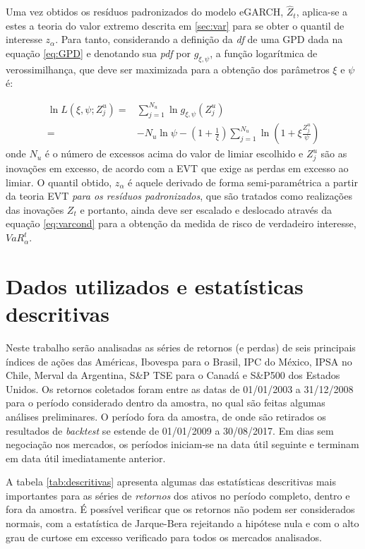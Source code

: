 \documentclass[1p]{elsarticle}
\theoremstyle{definition}
\begin{document}
Uma vez obtidos os resíduos padronizados do modelo eGARCH, $\hat{Z}_t$, aplica-se a estes a teoria do valor extremo descrita em \ref{sec:var} para se obter o quantil de interesse $z_\alpha$. Para tanto, considerando a definição da \emph{df} de uma GPD dada na equação \eqref{eq:GPD} e denotando sua \emph{pdf} por $g_{\xi, \psi}$, a função logarítmica de verossimilhança, que deve ser maximizada para a obtenção dos parâmetros $\xi$ e $\psi$ é:

\begin{align}
\label{eq:gpdloglik}
\ln L(\xi, \psi; Z^u_j)=&\sum\limits_{j=1}^{N_u}\ln g_{\xi, \psi}(Z^u_j)\nonumber\\
					   =&-N_u \ln \psi-\left(1+\frac{1}{\xi}\right)\sum\limits_{j=1}^{N_u}\ln \left(1+\xi\frac{Z^u_j}{\psi}\right) 
\end{align}
onde $N_u$ é o número de excessos acima do valor de limiar escolhido e $Z^u_j$ são as inovações em excesso, de acordo com a EVT que exige as perdas em excesso ao limiar. O quantil obtido, $z_\alpha$ é aquele derivado de forma semi-paramétrica a partir da teoria EVT \emph{para os resíduos padronizados}, que são tratados como realizações das inovações $Z_t$ e portanto, ainda deve ser escalado e deslocado através da equação \eqref{eq:varcond} para a obtenção da medida de risco de verdadeiro interesse, $VaR_\alpha^t$.

\section{Dados utilizados e estatísticas descritivas}
\label{sec:descritivas}

Neste trabalho serão analisadas as séries de retornos (e perdas) de seis principais índices de ações das Américas, Ibovespa para o Brasil, IPC do México, IPSA no Chile, Merval da Argentina, S\&P TSE para o Canadá e S\&P500 dos Estados Unidos. Os retornos coletados foram entre as datas de 01/01/2003 a 31/12/2008 para o período considerado dentro da amostra, no qual são feitas algumas análises preliminares. O período fora da amostra, de onde são retirados os resultados de \emph{backtest} se estende de 01/01/2009 a 30/08/2017. Em dias sem negociação nos mercados, os períodos iniciam-se na data útil seguinte e terminam em data útil imediatamente anterior.

A tabela \ref{tab:descritivas} apresenta algumas das estatísticas descritivas mais importantes para as séries de \emph{retornos} dos ativos no período completo, dentro e fora da amostra. É possível verificar que os retornos não podem ser considerados normais, com a estatística de Jarque-Bera rejeitando a hipótese nula e com o alto grau de curtose em excesso verificado para todos os mercados analisados.
\end{document}
